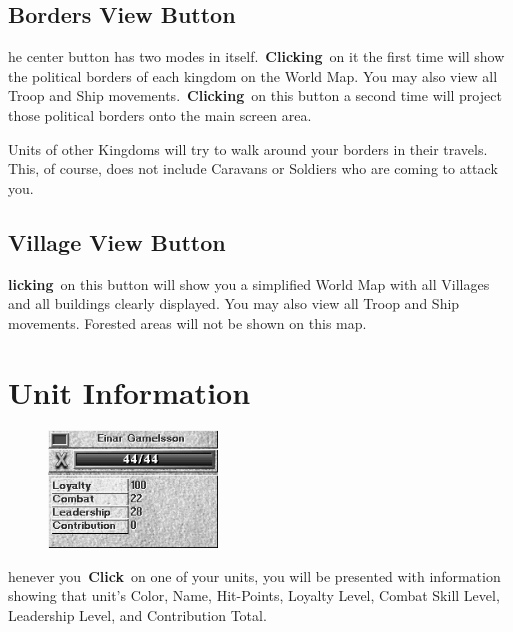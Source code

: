 \subsection{Borders View Button}


he center button has two modes in itself. \textbf{Clicking} on it the first time will show the political borders of each kingdom on the World Map. You may also view all Troop and Ship movements. \textbf{Clicking} on this button a second time will project those political borders onto the main screen area.

Units of other Kingdoms will try to walk around your borders in their travels. This, of course, does not include Caravans or Soldiers who are coming to attack you.

\subsection{Village View Button}


\textbf{licking} on this button will show you a simplified World Map with all Villages and all buildings clearly displayed. You may also view all Troop and Ship movements. Forested areas will not be shown on this map.

\section{Unit Information}

\begin{figure}
	\vspace{-20pt}
	\begin{center}
		\includegraphics[width=0.4\textwidth]{Iunitinfo}
	\end{center}
	\vspace{-20pt}
\end{figure}

henever you \textbf{Click} on one of your units, you will be presented with information showing that unit’s Color, Name, Hit-Points, Loyalty Level, Combat Skill Level, Leadership Level, and Contribution Total.

